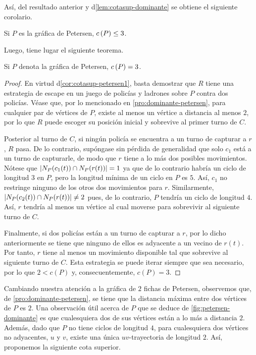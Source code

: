 As\'i, del resultado anterior y d\cref{lem:cotasup-dominante} se obtiene el
siguiente corolario.

\begin{corolario}
\label{cor:cotasup-petersen1}
    Si $P$ es la gr\'afica de Petersen, $c\left( P\right)\leq 3$.
\end{corolario}
Luego, tiene lugar el siguiente teorema.

\begin{teorema}
\label{teo:numero-policiaco-petersen}
    Si $P$ denota la gr\'afica de Petersen, $c\left( P\right)=3$.
\end{teorema}

\begin{proof}
    En virtud d\cref{cor:cotasup-petersen1}, basta demostrar que $R$ tiene una
    estrategia de escape en un juego de polic\'ias y ladrones sobre $P$ contra
    dos polic\'ias. V\'ease que, por lo mencionado en
    \cref{pro:dominante-petersen}, para cualquier par de v\'ertices de $P$, existe
    al menos un v\'ertice a distancia al menos $2$, por lo que $R$ puede escoger
    su posici\'on inicial y sobrevive al primer turno de $C$.

    \newpage
    
    Posterior al turno de $C$, si ning\'un polic\'ia se encuentra a un turno de
    capturar a $r$, $R$ pasa. De lo contrario, sup\'ongase sin p\'erdida de
    generalidad que solo $c_1$ est\'a a un turno de capturarle, de modo que $r$
    tiene a lo m\'as dos posibles movimientos. N\'otese que
    $\left|N_P(c_1(t))\cap N_P(r(t))\right|=1$ ya que de lo contrario habr\'ia un ciclo
    de longitud $3$ en $P$, pero la longitud m\'inima de un ciclo en $P$ es $5$.
    As\'i, $c_1$ no restringe ninguno de los otros dos movimientos para $r$.
    Similarmente, $\left|N_P(c_2(t))\cap N_P(r(t))\right|\neq 2$ pues, de lo contrario,
    $P$ tendr\'ia un ciclo de longitud $4$. As\'i, $r$ tendr\'ia al menos un
    v\'ertice al cual moverse para sobrevivir al siguiente turno de $C$.

    Finalmente, si dos polic\'ias est\'an a un turno de capturar a $r$, por lo
    dicho anteriormente se tiene que ninguno de ellos es adyacente a un vecino
    de $r(t)$. Por tanto, $r$ tiene al menos un movimiento disponible tal que
    sobrevive al siguiente turno de $C$. Esta estrategia se puede iterar siempre
    que sea necesario, por lo que $2<c(P)$ y, consecuentemente, $c(P)=3$.

\end{proof}

Cambiando nuestra atenci\'on a la gr\'afica de $2$ fichas de Petersen,
observemos que, de \cref{pro:dominante-petersen}, se tiene que la distancia
m\'axima entre dos v\'ertices de $P$ es $2$. Una observaci\'on \'util acerca de
$P$ que se deduce de \cref{fig:petersen-dominante} es que cualesquiera dos de
sus v\'ertices est\'an a lo m\'as a distancia $2$. Adem\'as, dado que $P$ no
tiene ciclos de longitud $4$, para cualesquiera dos v\'ertices no adyacentes,
$u$ y $v$, existe una \'unica $uv$-trayectoria de longitud $2$. As\'i,
proponemos la siguiente cota superior.

